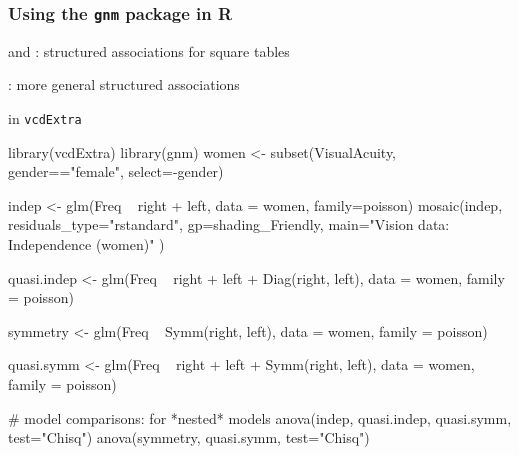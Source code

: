 \begin{frame}[fragile]
\frametitle{Using the \texttt{gnm} package in R}
 \begin{itemize*}
 	\item {} and : structured associations for square tables
 	\item {}: more general structured associations
	\item {} in \texttt{vcdExtra}
 \end{itemize*}
\begin{Rin}[baselinestretch=0.8]
library(vcdExtra)
library(gnm)
women <- subset(VisualAcuity, gender=="female", select=-gender)

indep <- glm(Freq ~ right + left, data = women, family=poisson)
mosaic(indep, residuals_type="rstandard", gp=shading_Friendly,
       main="Vision data: Independence (women)"  )

quasi.indep <- glm(Freq ~ right + left + Diag(right, left), 
       data = women, family = poisson)

symmetry <- glm(Freq ~ Symm(right, left), 
       data = women, family = poisson)

quasi.symm <- glm(Freq ~ right + left + Symm(right, left), 
       data = women, family = poisson)

# model comparisons: for *nested* models
anova(indep, quasi.indep, quasi.symm, test="Chisq")
anova(symmetry, quasi.symm, test="Chisq")
\end{Rin}
\end{frame}

\endinput

